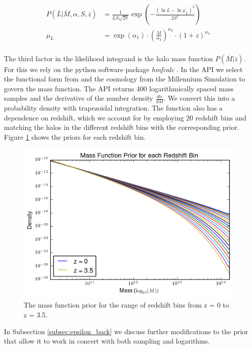 \documentclass[\docopts]{\docclass}
\begin{document}
\begin{align*}
P(\overline{L}|\overline{M},\alpha,S,\overline{z}) &= \frac{1}{\overline{L}S\sqrt{2\pi}}\exp\left(-\frac{(\ln \overline{L} - \ln \overline{\mu_L})^2}{2S^{2}}\right)\\
\mu_L &= \exp(\alpha_1) \cdot \left(\frac{M}{\alpha_3}\right)^{\alpha_2} \cdot (1+z)^{\alpha_4}\\
\end{align*}

The third factor in the likelihood integrand is the halo mass function $P(\overline{M}|\overline{z})$. 
For this we rely on the python software package \emph{hmfcalc} \citep*{hmf}. 
In the API we select the functional form from \citep{tinker} and the cosmology from the Millennium Simulation to govern the mass function. 
The API returns 400 logarithmically spaced mass samples and the derivative of the number density $\frac{dn}{dM}$. 
We convert this into a probability density with trapezoidal integration.
The function also has a dependence on redshift, which we account for by employing 20 redshift bins and matching the halos in the different redshift bins with the corresponding prior.
Figure \ref{fig:priors} shows the priors for each redshift bin.

\begin{figure}[h]
\centering
\includegraphics[width=0.9\columnwidth]{priors.png}
\caption{
The mass function prior for the range of redshift bins from z = 0 to z = 3.5.
\label{fig:priors}}
\end{figure}

In Subsection \ref{subsec:epsilon_back} we discuss further modifications to the prior that allow it to work in concert with both sampling and logarithms. 
\end{document}
